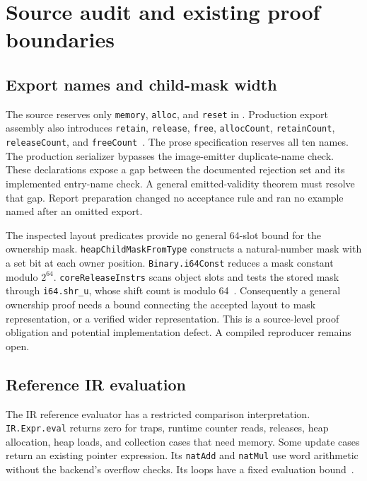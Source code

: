 \documentclass[11pt]{article}
\newcommand{\code}[1]{\texttt{#1}}
\newcommand{\longcode}[1]{\texttt{\seqsplit{#1}}}
\begin{document}
\section{Source audit and existing proof boundaries}
\label{sec:audit}

\subsection{Export names and child-mask width}

The source reserves only \code{memory}, \code{alloc}, and \code{reset} in \longcode{Extract.Core.reservedExportNames}.  Production export assembly also introduces \code{retain}, \code{release}, \code{free}, \code{allocCount}, \code{retainCount}, \code{releaseCount}, and \code{freeCount}~\cite{extract,binary}.  The prose specification reserves all ten names.  The production serializer bypasses the image-emitter duplicate-name check.  These declarations expose a gap between the documented rejection set and its implemented entry-name check.  A general emitted-validity theorem must resolve that gap.  Report preparation changed no acceptance rule and ran no example named after an omitted export.

The inspected layout predicates provide no general 64-slot bound for the ownership mask.  \code{heapChildMaskFromType} constructs a natural-number mask with a set bit at each owner position.  \code{Binary.i64Const} reduces a mask constant modulo $2^{64}$.  \code{coreReleaseInstrs} scans object slots and tests the stored mask through \code{i64.shr\_u}, whose shift count is modulo 64~\cite{values,binary,wasm}.  Consequently a general ownership proof needs a bound connecting the accepted layout to mask representation, or a verified wider representation.  This is a source-level proof obligation and potential implementation defect.  A compiled reproducer remains open.

\subsection{Reference IR evaluation}

The IR reference evaluator has a restricted comparison interpretation.  \code{IR.Expr.eval} returns zero for traps, runtime counter reads, releases, heap allocation, heap loads, and collection cases that need memory.  Some update cases return an existing pointer expression.  Its \code{natAdd} and \code{natMul} use word arithmetic without the backend's overflow checks.  Its loops have a fixed evaluation bound~\cite{ir}.
\end{document}
